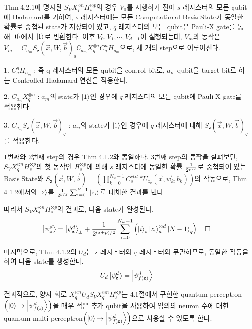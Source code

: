 \begin{pf}

Thm 4.2.1에 명시된 \(S_V X_q^{\otimes n} H_s^{\otimes p}\)의 경우 $V_0$를 시행하기 전에 \(s\) 레지스터의 모든 qubit에 Hadamard를 가하여, \(s\) 레지스터에는 모든 Computational Basis State가 동일한 확률로 중첩된 state가 저장되어 있고, \(q\) 레지스터의 모든 qubit은 Pauli-X gate를 통해 \(\ket 0\)에서 \(\ket 1\)로 변환한다. 이후 \(V_0, V_1, \cdots, V_{d-1}\)이 실행되는데, $V_m$의 동작은 \(V_m = C_{a_m}S_{\mathbf{z}}(\vec{x}, W, \vec{b})_q C_{a_m}X^{\otimes n}_q C_q^nH_{a_m}\)으로, 세 개의 step으로 이루어진다.

1. \(C_q^nH_{a_m}\) : 즉 q 레지스터의 모든 qubit을 control bit로, \(a_m\) qubit을 target bit로 하는 Controlled-Hadamard 연산을 적용한다.

2. \(C_{a_m}X^{\otimes n}_q\) : \(a_m\)의 state가 \(\ket 1\)인 경우에 \(q\) 레지스터의 모든 qubit에 Pauli-X gate를 적용한다.

3. \(C_{a_m}S_{\mathbf{z}}(\vec{x}, W, \vec{b})_q\) : \(a_m\)의 state가 \(\ket 1\)인 경우에 \(q\) 레지스터에 대해 \(S_{\mathbf{z}}(\vec{x}, W, \vec{b})_q\)를 적용한다.

1번째와 2번째 step의 경우 Thm 4.1.2와 동일하다. 3번째 step의 동작을 살펴보면, \(S_V X_q^{\otimes n} H_s^{\otimes p}\)의 첫 동작인 \(H_s^{\otimes p}\)에 의해 \(s\) 레지스터에 동일한 확률 \(1 \over {2^{p/2}}\)로 중첩되어 있는 Basis State와 \(S_{\mathbf z}(\vec{x}, W, \vec{b})= \left(\prod_{k=0}^{N_w-1}C_{s}^{ctrl : k}U_{z_k}(\vec{x}, \vec{w}_k, b_k)\right)\)의 작동으로, Thm 4.1.2에서의 \(\ket{z}\)를 \({1\over {2^{p/2}}}\sum_{i=0}^{P-1} \ket{z_i}\)로 대체한 결과를 낸다.

따라서 \(S_V X_q^{\otimes n} H_s^{\otimes p}\)의 결과로, 다음 state가 완성된다.
\[
    \ket{\psi_{\mathbf z}^d} = \ket{\psi_{\mathbf z}^d}_{\perp} + {1 \over {2^{(d + p) / 2}}}\sum_{i=0}^{N_w - 1}\left( \ket{i}_{s} \ket{z_i}_{a}^{\otimes d} \ket{N-1}_q \right) \quad \square
\]
\end{pf}

마지막으로, Thm 4.1.2의 $U_d$는 \(s\) 레지스터와 \(q\) 레지스터와 무관하므로, 동일한 작동을 하여 다음 state를 생성한다.
\[
    U_d \ket{\psi_{\mathbf z}^d} = \ket{\psi_{f(\mathbf z)}^d}
\]

결과적으로, 양자 회로 \(X_q^{\otimes n} U_d S_V X_q^{\otimes n} H_s^{\otimes p}\)는 4.1절에서 구현한 quantum perceptron\(\left(\ket{0} \rightarrow \ket{\psi_{ f(z)}^d}\right)\)을 매우 적은 추가 qubit을 사용하여 임의의 neuron 수에 대한 quantum multi-perceptron\(\left(\ket{0} \rightarrow \ket{\psi_{f(\mathbf z)}^d}\right)\)으로 사용할 수 있도록 한다.